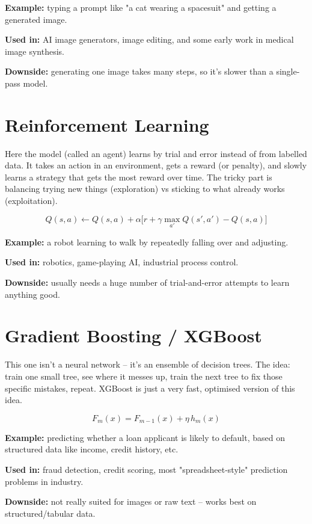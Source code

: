 \documentclass[11pt]{article}
\begin{document}
\textbf{Example:} typing a prompt like "a cat wearing a spacesuit" and getting a generated image.

\textbf{Used in:} AI image generators, image editing, and some early work in medical image synthesis.

\textbf{Downside:} generating one image takes many steps, so it's slower than a single-pass model.

\section{Reinforcement Learning}

Here the model (called an agent) learns by trial and error instead of from labelled data. It takes an action in an environment, gets a reward (or penalty), and slowly learns a strategy that gets the most reward over time. The tricky part is balancing trying new things (exploration) vs sticking to what already works (exploitation).

\[
Q(s,a) \leftarrow Q(s,a) + \alpha\Big[r + \gamma \max_{a'} Q(s',a') - Q(s,a)\Big]
\]

\textbf{Example:} a robot learning to walk by repeatedly falling over and adjusting.

\textbf{Used in:} robotics, game-playing AI, industrial process control.

\textbf{Downside:} usually needs a huge number of trial-and-error attempts to learn anything good.

\section{Gradient Boosting / XGBoost}

This one isn't a neural network -- it's an ensemble of decision trees. The idea: train one small tree, see where it messes up, train the next tree to fix those specific mistakes, repeat. XGBoost is just a very fast, optimised version of this idea.

\[
F_m(x) = F_{m-1}(x) + \eta\, h_m(x)
\]

\textbf{Example:} predicting whether a loan applicant is likely to default, based on structured data like income, credit history, etc.

\textbf{Used in:} fraud detection, credit scoring, most "spreadsheet-style" prediction problems in industry.

\textbf{Downside:} not really suited for images or raw text -- works best on structured/tabular data.
\end{document}
